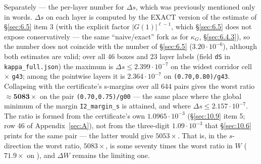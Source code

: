 Separately --- the per-layer number for $\Delta s$, which was previously mentioned only in words.
$\Delta s$ on each layer is computed by the EXACT version of the estimate of \S\ref{sec:6.5} item 3
(with the explicit factor $|G(1)|^{\ell-1}$, which \S\ref{sec:6.5} does not expose conservatively --- the same
``naive/exact'' fork as for $\kappa_G$, \S\ref{sec:6.4.3}), so the number does not coincide with the
number of \S\ref{sec:6.5} ($3.20\cdot 10^{-6}$), although both estimates are valid; over all 46 boxes and 23
layer labels (field \texttt{dS} in \texttt{kappa\_\allowbreak full.json}) the maximum is $\Delta s \le 2.399\cdot 10^{-7}$ on the
widest corridor cell $\times$ \texttt{g43}; among the pointwise layers it is $2.364\cdot 10^{-7}$ on
\texttt{(0.70,0.80)/\allowbreak g43}.
Collapsing with the certificate's s-margins over all 644 pairs gives the worst ratio
$\mathbf{\approx 5083\times}$ on the pair \texttt{(0.70,0.75)/\allowbreak g00} --- the same place where the global
minimum of the margin \texttt{I2\_margin\_s} is attained, and where $\Delta s \le 2.157\cdot 10^{-7}$. The ratio is
formed from the certificate's own $1.0965\cdot 10^{-3}$ (\S\ref{sec:10.9} item 5; row 46 of
Appendix~\ref{sec:A}), not from the three-digit $1.09\cdot 10^{-3}$ that \S\ref{sec:10.6} prints for the
same pair --- the latter would give $5053\times$. That is,
in the $s$-direction the worst ratio, $5083\times$, is some seventy times the worst ratio in
$W$ ($71.9\times$ on \Qcell), and $\Delta W$ remains the limiting one.

